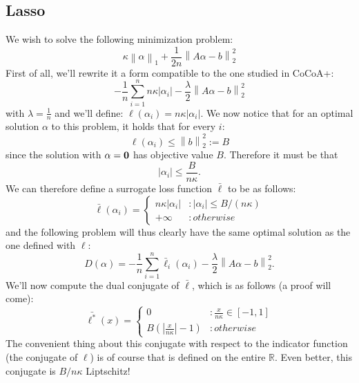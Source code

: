 \documentclass{article}
\newcommand{\0}{ {\bf 0}}
\newcommand{\norm}[1]{\left\lVert{#1}\right\rVert}
\theoremstyle{plain}
\theoremstyle{definition}
\begin{document}
\subsection{Lasso}
We wish to solve the following minimization problem:
$$
\kappa {\norm{\alpha}}_1 + \frac{1}{2n} {\norm{A\alpha - b}}_2^2
$$
First of all, we'll rewrite it a form compatible to the one studied in CoCoA+:
$$
-\frac{1}{n} \sum_{i = 1}^{n} {n \kappa |\alpha_i|} - \frac{\lambda}{2} {\norm{A\alpha - b}}_2^2
$$
with $\lambda = \frac{1}{n}$ and we'll define:
$
\ell(\alpha_i) = n \kappa |\alpha_i|
$.
We now notice that for an optimal solution $\alpha$ to this problem, it holds that for every $i$:
$$
\ell(\alpha_i) \leq {\norm{b}}^2_2 := B
$$
since the solution with $\alpha = \bf{0}$ has objective value $B$. Therefore it must be that
$$
|\alpha_i| \leq \frac{B}{n\kappa}.
$$
We can therefore define a surrogate loss function $\bar{\ell}$ to be as follows:
\begin{displaymath}
    \bar{\ell}(\alpha_i) = \left\{
        \begin{array}{lr}
            n \kappa |\alpha_i| & : |\alpha_i| \leq B / (n \kappa) \\
            +\infty & : otherwise
        \end{array}
    \right.
\end{displaymath}
and the following problem will thus clearly have the same optimal solution as the one defined with $\ell$:
$$
D(\alpha) = -\frac{1}{n} \sum_{i = 1}^{n} \bar{\ell}_i(\alpha_i) - \frac{\lambda}{2} {\norm{A\alpha - b}}_2^2.
$$
We'll now compute the dual conjugate of $\bar{\ell}$, which is as follows (a proof will come):
\begin{displaymath}
    \bar{\ell^*}(x) = \left\{
        \begin{array}{lr}
            0 & : \frac{x}{n\kappa} \in [-1,1]  \\
            B(|\frac{x}{n\kappa}| - 1) & : otherwise
        \end{array}
    \right.
\end{displaymath}
The convenient thing about this conjugate with respect to the indicator function (the conjugate of $\ell$) is of course
that is defined on the entire $\mathbb{R}$. Even better, this conjugate is $B/{n \kappa}$ Liptschitz!
\end{document}
